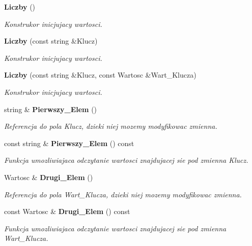\begin{DoxyCompactItemize}
\item 
{\bf Liczby} ()\label{class_liczby_a66f265a1435d71e55a24157add977fde}

\begin{DoxyCompactList}\small\item\em Konstrukor inicjujacy wartosci. \end{DoxyCompactList}\item 
{\bf Liczby} (const string \&Klucz)\label{class_liczby_a2bc226dc4fcbc07536d8ff79e2f6bd4f}

\begin{DoxyCompactList}\small\item\em Konstrukor inicjujacy wartosci. \end{DoxyCompactList}\item 
{\bf Liczby} (const string \&Klucz, const Wartosc \&Wart\-\_\-\-Klucza)\label{class_liczby_ac7c4a7ed9d018bb2928d67e36e36008a}

\begin{DoxyCompactList}\small\item\em Konstrukor inicjujacy wartosci. \end{DoxyCompactList}\item 
string \& {\bf Pierwszy\-\_\-\-Elem} ()
\begin{DoxyCompactList}\small\item\em Referencja do pola Klucz, dzieki niej mozemy modyfikowac zmienna. \end{DoxyCompactList}\item 
const string \& {\bf Pierwszy\-\_\-\-Elem} () const 
\begin{DoxyCompactList}\small\item\em Funkcja umozliwiajaca odczytanie wartosci znajdujacej sie pod zmienna Klucz. \end{DoxyCompactList}\item 
Wartosc \& {\bf Drugi\-\_\-\-Elem} ()
\begin{DoxyCompactList}\small\item\em Referencja do pola Wart\-\_\-\-Klucza, dzieki niej mozemy modyfikowac zmienna. \end{DoxyCompactList}\item 
const Wartosc \& {\bf Drugi\-\_\-\-Elem} () const 
\begin{DoxyCompactList}\small\item\em Funkcja umozliwiajaca odczytanie wartosci znajdujacej sie pod zmienna Wart\-\_\-\-Klucza. \end{DoxyCompactList}\end{DoxyCompactItemize}


